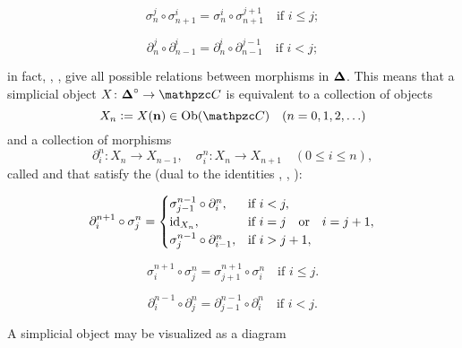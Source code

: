 \begin{equation}
  \label{eqn:cosimplicial-identity-2}
  \sigma^j_n \circ \sigma^i_{n+1} = \sigma^i_n \circ \sigma^{j+1}_{n+1}
  \quad \text{if }i \le j;
\end{equation}

\begin{equation}
  \label{eqn:cosimplicial-identity-3}
  \partial^j_n \circ \partial^i_{n-1} = \partial^i_n \circ \partial^{j-1}_{n-1}
  \quad \text{if } i < j;
\end{equation}

\noindent in fact, ,
,  give
all possible relations between morphisms in ${\boldsymbol\Delta}$. This means that a
simplicial object $X\colon \bDelta^\circ \to \vcateg{C}$ is equivalent to a
collection of objects
$$X_n \dfn X (\mathbf{n}) \in \Ob (\vcateg{C}) \quad (n = 0,1,2,\ldots)$$
and a collection of morphisms
\[ \partial_i^n\colon X_n \to X_{n-1}, \quad
  \sigma_i^n\colon X_n\to X_{n+1} \quad
  (0\le i\le n), \]
called  and  that satisfy the
 (dual to the identities
, ,
):

\begin{equation}
  \label{eqn:simplicial-identity-1}
  \partial_i^{n+1}\circ \sigma_j^n = \begin{cases}
    \sigma_{j-1}^{n-1}\circ \partial_i^n, & \text{if }i < j, \\
    \mathrm{id}_{X_n}, & \text{if }i = j \quad\text{or}\quad i = j+1, \\
    \sigma_j^{n-1}\circ \partial_{i-1}^n, & \text{if }i > j + 1,
  \end{cases}
\end{equation}

\begin{equation}
  \label{eqn:simplicial-identity-2}
  \sigma_i^{n+1}\circ \sigma_j^n = \sigma_{j+1}^{n+1}\circ \sigma_i^n
  \quad \text{if }i \le j.
\end{equation}

\begin{equation}
  \label{eqn:simplicial-identity-3}
  \partial_i^{n-1} \circ \partial_j^n = \partial_{j-1}^{n-1}\circ \partial_i^n
  \quad \text{if } i < j.
\end{equation}

A simplicial object may be visualized as a diagram

